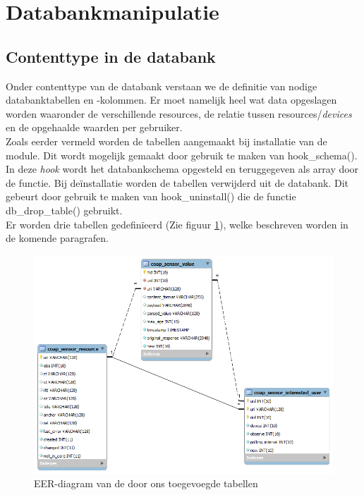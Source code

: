 \section{Databankmanipulatie}

\subsection{Contenttype in de databank}\label{databankSchema}
Onder contenttype van de databank verstaan we de definitie van nodige databanktabellen en -kolommen. Er moet namelijk heel wat data opgeslagen worden waaronder de verschillende resources, de relatie tussen resources/\textit{devices} en de opgehaalde waarden per gebruiker.\\

Zoals eerder vermeld worden de tabellen aangemaakt bij installatie van de module. Dit wordt mogelijk gemaakt door gebruik te maken van hook\_schema(). In deze \textit{hook} wordt het databankschema opgesteld en teruggegeven als array door de functie. Bij de\"{i}nstallatie worden de tabellen verwijderd uit de databank. Dit gebeurt door gebruik te maken van hook\_uninstall() die de functie db\_drop\_table() gebruikt.\\

\noindent
Er worden drie tabellen gedefin\"{i}eerd (Zie figuur \ref{fig:databankModel}), welke beschreven worden in de komende paragrafen.
\begin{figure}[h!]
\centering
\includegraphics[width=1\textwidth]{fig/databankModel}
\caption{EER-diagram van de door ons toegevoegde tabellen}
\label{fig:databankModel}
\end{figure}

